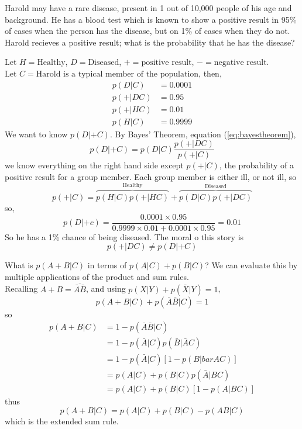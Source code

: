 \documentclass{dwnotes}         		        %
\begin{document}
\begin{example}
  Harold may have a rare disease, present in 1 out of 10,000 people of
  his age and background. He has a blood test which is known to show a
  positive result in 95\% of cases when the person has the disease,
  but on 1\% of cases when they do not.
  Harold recieves a positive result; what is the probability that he has the disease?

  Let $H = \text{Healthy}$, $D = \text{Diseased}$, $+ = \text{positive result}$, $- = \text{negative result}$. \\
  Let $C = \text{Harold is a typical member of the population}$, then,
  \begin{align*}
    p(D|C) &= 0.0001 \\
p(+|DC) &= 0.95 \\
p(+|HC) &= 0.01 \\
p(H|C) &= 0.9999
  \end{align*}
We want to know $p(D|+C)$.
By Bayes' Theorem, equation (\ref{eq:bayestheorem}),
\[ p(D|+C) = p(D|C) \frac{p(+|DC)}{p(+|C)} \] we know everything on
the right hand side except $p(+|C)$, the probability of a positive
result for a group member. Each group member is either ill, or not
ill, so
\[ p(+|C) = \overbrace{p(H|C) p(+|HC)}^{\text{Healthy}} 
   + \overbrace{p(D|C) p(+|DC)}^{\text{Diseased}} \]
so,
\[ p(D|+c) = \frac{0.0001 \times 0.95}{0.9999 \times 0.01 + 0.0001 \times 0.95} = 0.01\]
So he has a 1\% chance of being diseased. The moral o this story is \[ p(+|DC) \neq p(D|+C) \]
\end{example}

\begin{example}
  What is $p(A+B|C)$ in terms of $p(A|C) + p(B|C)$?  We can evaluate
  this by multiple applications of the product and sum rules.
  \\Recalling $A+B = \overline{\bar{A} \bar{B}}$, and using $p(X|Y) +
  p(\bar{X}|Y) = 1$,
\[ p(A+B | C) + p(\bar{A} \bar{B} | C) = 1 \]
so
\begin{align*}
   p(A+B|C) &= 1 - p(\bar{A}\bar{B}| C)\\
&= 1 - p(\bar{A}|C) p(\bar{B}| \bar{A}C)\\
&= 1 - p(\bar{A}| C) \left[ 1 - p(B|bar{A}C) \right] \\
&= p(A|C) + p(B|C) p(\bar{A}| BC) \\
&= p(A|C)+p(B|C)[1-p(A|BC)]
\end{align*}
thus
\[ p(A+B|C) = p(A|C)+p(B|C)-p(AB|C) \]
which is the extended sum rule.
\end{example}
\end{document}
